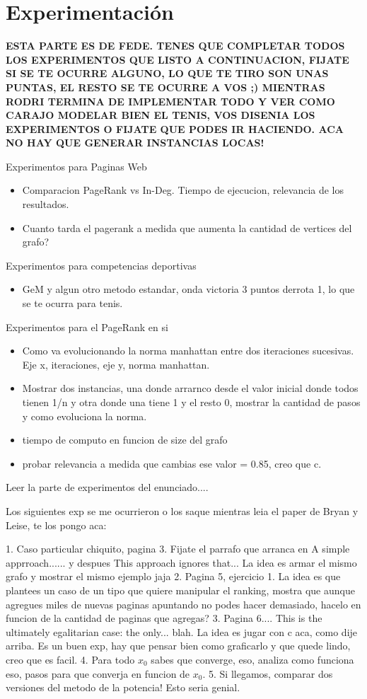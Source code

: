 \section{Experimentación}

\textbf{ESTA PARTE ES DE FEDE. TENES QUE COMPLETAR TODOS LOS EXPERIMENTOS QUE LISTO A CONTINUACION, FIJATE SI SE TE OCURRE ALGUNO, LO QUE TE TIRO SON UNAS PUNTAS, EL RESTO SE TE OCURRE A VOS ;) MIENTRAS RODRI TERMINA DE IMPLEMENTAR TODO Y VER COMO CARAJO MODELAR BIEN EL TENIS, VOS DISENIA LOS EXPERIMENTOS O FIJATE QUE PODES IR HACIENDO. ACA NO HAY QUE GENERAR INSTANCIAS LOCAS!}

Experimentos para Paginas Web
\begin{itemize}
\item Comparacion PageRank vs In-Deg. Tiempo de ejecucion, relevancia de los resultados.
\item Cuanto tarda el pagerank a medida que aumenta la cantidad de vertices del grafo?
\end{itemize}

Experimentos para competencias deportivas
\begin{itemize}
\item GeM y algun otro metodo estandar, onda victoria 3 puntos derrota 1, lo que se te ocurra para tenis.
\end{itemize}

Experimentos para el PageRank en si\begin{itemize}
\item Como va evolucionando la norma manhattan entre dos iteraciones sucesivas. Eje x, iteraciones, eje y, norma manhattan.
\item Mostrar dos instancias, una donde arrarnco desde el valor inicial donde todos tienen 1/n y otra donde una tiene 1 y el resto 0, mostrar la cantidad de pasos y como evoluciona la norma.
\item tiempo de computo en funcion de size del grafo
\item probar relevancia a medida que cambias ese valor = 0.85, creo que c.
\end{itemize}

Leer la parte de experimentos del enunciado....

Los siguientes exp se me ocurrieron o los saque mientras leia el paper de Bryan y Leise, te los pongo aca:

1. Caso particular chiquito, pagina 3. Fijate el parrafo que arranca en A simple apprroach...... y despues This approach ignores that... La idea es armar el mismo grafo y mostrar el mismo ejemplo jaja
2. Pagina 5, ejercicio 1. La idea es que plantees un caso de un tipo que quiere manipular el ranking, mostra que aunque agregues miles de nuevas paginas apuntando no podes hacer demasiado, hacelo en funcion de la cantidad de paginas que agregas?
3. Pagina 6.... This is the ultimately egalitarian case: the only... blah. La idea es jugar con c aca, como dije arriba. Es un buen exp, hay que pensar bien como graficarlo y que quede lindo, creo que es facil.
4. Para todo $x_0$ sabes que converge, eso, analiza como funciona eso, pasos para que converja en funcion de $x_0$.
5. Si llegamos, comparar dos versiones del metodo de la potencia! Esto seria genial.


